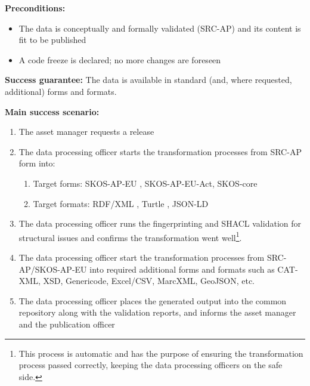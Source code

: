 	\textbf{Preconditions:} 
	\begin{itemize}
		\item The data is conceptually and formally validated (SRC-AP) and its content is fit to be published
		\item A code freeze is declared; no more changes are foreseen
	\end{itemize}
	
	\textbf{Success guarantee:} The data is available in standard (and, where requested, additional) forms and formats.
	
	\textbf{Main success scenario:}
	
	\begin{enumerate}
		\item The asset manager requests a release
		\item The data processing officer starts the transformation processes from SRC-AP form into:
		\begin{enumerate}
			\item Target forms: SKOS-AP-EU \citep{skos-ap-eu}, SKOS-AP-EU-Act, SKOS-core \citep{skos-spec}
			\item Target formats: RDF/XML \citep{rdf-xml-Beckett:04:RSS} , Turtle \citep{turtle-Carothers:14:RT} , JSON-LD \citep{spornyjson}
		\end{enumerate}		
		\item The data processing officer runs the fingerprinting and SHACL validation for structural issues and confirms the transformation went well\footnote{This process is automatic and has the purpose of ensuring the transformation process passed correctly, keeping the data processing officers on the safe side.}.
		\item The data processing officer start the transformation processes from SRC-AP/SKOS-AP-EU into required additional forms and formats such as CAT-XML, XSD, Genericode, Excel/CSV, MarcXML, GeoJSON, etc.
		\item The data processing officer places the generated output into the common repository along with the validation reports, and informs the asset manager and the publication officer		
	\end{enumerate}
	
